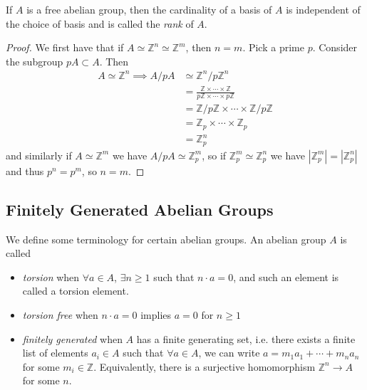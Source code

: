 \begin{prop}
If $A$ is a free abelian group, then the cardinality of a basis of $A$
is independent of the choice of basis and is called the \emph{rank} of $A$.
\end{prop}
\begin{proof}
We first have that if $A \simeq \mathbb{Z}^n \simeq \mathbb{Z}^m$, then $n =
m$. Pick a prime $p$. Consider the subgroup $pA \subset A$. Then
\begin{align*}
A \simeq \mathbb{Z}^n \implies
A / pA & \simeq \mathbb{Z}^n / p \mathbb{Z}^n \\
       & = \frac{\mathbb{Z} \times \cdots \times \mathbb{Z}}
                {p \mathbb{Z} \times \cdots \times p \mathbb{Z} }
                \\
       & = \mathbb{Z} / p \mathbb{Z}
           \times \cdots
           \times \mathbb{Z} / p \mathbb{Z} \\
       & = \mathbb{Z}_p
           \times \cdots
           \times \mathbb{Z}_p \\
       & = \mathbb{Z}_p^n
\end{align*}
and similarly if $A \simeq \mathbb{Z}^m$ we have
$A / pA \simeq \mathbb{Z}_p^m$, so if
$\mathbb{Z}_p^m \simeq \mathbb{Z}_p^n$ we have
$|\mathbb{Z}_p^m| = |\mathbb{Z}_p^n|$ and thus
$p^n = p^m$, so $n = m$.
\end{proof}

\subsection{Finitely Generated Abelian Groups}
\begin{defn}
We define some terminology for certain abelian groups.
An abelian group $A$ is called
\begin{itemize}
\item{
  \emph{torsion} when $\forall a \in A$,
  $\exists n \geq 1$ such that $n \cdot a = 0$,
  and such an element is called a torsion element.
}
\item{
  \emph{torsion free} when $n \cdot a = 0$ implies $a = 0$
  for $n \geq 1$
}
\item{
  \emph{finitely generated} when $A$ has a finite generating set, i.e.
  there exists a finite list of elements $a_i \in A$ such that
  $\forall a \in A$, we can write
  $a = m_1 a_1 + \cdots + m_n a_n$ for some $m_i \in \mathbb{Z}$.
  Equivalently, there is a surjective homomorphism $\mathbb{Z}^n \to
  A$ for some $n$.
}
\end{itemize}
\end{defn}

